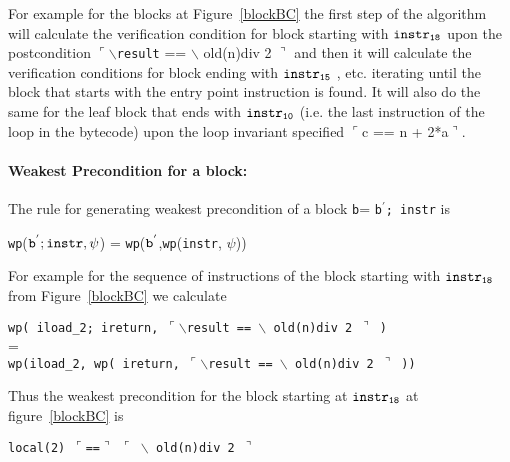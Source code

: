 For example for the blocks at Figure~\ref{blockBC} the first step of the algorithm will calculate the verification condition for block starting with $ \tt{instr_{18}}$ upon the postcondition  $\ulcorner \backslash$\texttt{result} == $\backslash$ old(n)div 2 $\urcorner$ and then it will calculate the verification conditions for block ending with $\tt{instr_{15}}$ , etc. iterating until the block that starts with the entry point instruction is found.
It will also do the same for the leaf block that ends with $\tt{instr_{10}}$ (i.e. the last instruction of the loop in the bytecode) upon the loop invariant specified $\ulcorner$c == n + 2*a$\urcorner$.

\paragraph{Weakest Precondition for a block: }\label{block}
The rule for generating weakest precondition of a block \texttt{b}= \texttt{b$^{'}$; instr} is
\begin{center}
\texttt{wp}($\tt{b^{'}; instr}, \psi$) = \texttt{wp}($\tt{b^{'}}$,\texttt{wp}(\texttt{instr}, $\psi$))
\end{center}

For example for the sequence of instructions of the block starting with $\tt{instr_{18}}$ from Figure~\ref{blockBC} we calculate
\begin{center}
\texttt{wp( iload\_2; ireturn,  $\ulcorner \backslash$\texttt{result} == $\backslash$ old(n)div 2 $\urcorner$ )}
\\
=
\\
\texttt{wp(iload\_2, wp( ireturn, $\ulcorner \backslash$\texttt{result} == $\backslash$ old(n)div 2 $\urcorner$ ))} \end{center}


Thus the weakest precondition for the block starting at $\tt{instr_{18}}$ at figure~\ref{blockBC} is

\texttt{local(2) $\ulcorner$==$\urcorner$ $\ulcorner$ $\backslash$ old(n)div 2 $\urcorner$}


